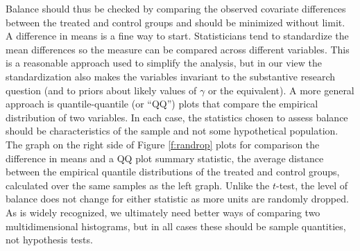 \documentclass[11pt,titlepage]{article}
\begin{document}
Balance should thus be checked by comparing the observed covariate
differences between the treated and control groups and should be
minimized without limit.  A difference in means is a fine way to
start.  Statisticians tend to standardize the mean differences so the
measure can be compared across different variables.  This is a
reasonable approach used to simplify the analysis, but in our view the
standardization also makes the variables invariant to the substantive
research question (and to priors about likely values of $\gamma$ or
the equivalent).  A more general approach is quantile-quantile (or
``QQ'') plots that compare the empirical distribution of two
variables.  In each case, the statistics chosen to assess balance
should be characteristics of the sample and not some hypothetical
population.  The graph on the right side of Figure \ref{f:randrop}
plots for comparison the difference in means and a QQ plot summary
statistic, the average distance between the empirical quantile
distributions of the treated and control groups, calculated over the
same samples as the left graph.  Unlike the $t$-test, the level of balance does not
change for either statistic as more units are randomly dropped.  As is
widely recognized, we ultimately need better ways of comparing two
multidimensional histograms, but in all cases these should be sample
quantities, not hypothesis tests.




\end{document}
